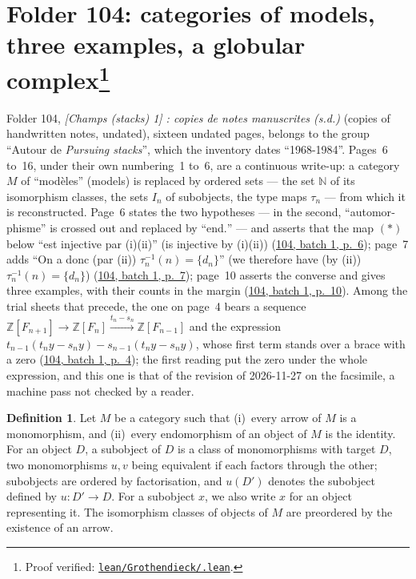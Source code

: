 \documentclass[11pt]{article}
\newcommand{\q}[1]{“#1”}
\newcommand{\fr}[1]{\textfrench{#1}}
\newcommand{\lot}[3]{\href{https://grothendieck.commutator.io/\##1/#2/p#3}{#1, batch #2, p.~#3}}
\newcommand{\verifie}[1]{\footnote{Proof verified: \href{https://github.com/Commutator-IO/grothendieck-project/blob/article-lean-2026-10/lean/Grothendieck/#1.lean}{\texttt{lean/Grothendieck/\detokenize{#1}.lean}}.}}
\theoremstyle{plain}
\theoremstyle{definition}
\newtheorem*{definition}{Definition}
\theoremstyle{remark}
\begin{document}
\section[Folder 104: categories of models, three examples, a globular complex]{Folder 104: categories of models, three examples, a globular complex\protect\verifie{Folder104}}\label{sec:104}

Folder 104, \emph{\fr{[Champs (stacks) 1] : copies de notes manuscrites (s.d.)}} (copies of handwritten notes, undated), sixteen undated pages, belongs to the group \q{Autour de \emph{Pursuing stacks}}, which the inventory dates \q{1968-1984}. Pages~6 to~16, under their own numbering~1 to~6, are a continuous write-up: a category $M$ of \q{\fr{modèles}} (models) is replaced by ordered sets --- the set $\mathbb N$ of its isomorphism classes, the sets $I_n$ of subobjects, the type maps $\tau_n$ --- from which it is reconstructed. Page~6 states the two hypotheses --- in the second, \q{\fr{automorphisme}} is crossed out and replaced by \q{\fr{end.}} --- and asserts that the map $(*)$ below \q{\fr{est injective par (i)(ii)}} (is injective by (i)(ii)) (\lot{104}{1}{6}); page~7 adds \q{\fr{On a donc (par (ii)) $\tau_n^{-1}(n) = \{d_n\}$}} (we therefore have (by (ii)) $\tau_n^{-1}(n) = \{d_n\}$) (\lot{104}{1}{7}); page~10 asserts the converse and gives three examples, with their counts in the margin (\lot{104}{1}{10}). Among the trial sheets that precede, the one on page~4 bears a sequence $\mathbb Z[F_{n+1}] \to \mathbb Z[F_n] \xrightarrow{t_n - s_n} \mathbb Z[F_{n-1}]$ and the expression $t_{n-1}(t_n y - s_n y) - s_{n-1}(t_n y - s_n y)$, whose first term stands over a brace with a zero (\lot{104}{1}{4}); the first reading put the zero under the whole expression, and this one is that of the revision of 2026-11-27 on the facsimile, a machine pass not checked by a reader.

\begin{definition}
Let $M$ be a category such that (i)~every arrow of $M$ is a monomorphism, and (ii)~every endomorphism of an object of $M$ is the identity. For an object $D$, a subobject of $D$ is a class of monomorphisms with target $D$, two monomorphisms $u, v$ being equivalent if each factors through the other; subobjects are ordered by factorisation, and $u(D')$ denotes the subobject defined by $u : D' \to D$. For a subobject $x$, we also write $x$ for an object representing it. The isomorphism classes of objects of $M$ are preordered by the existence of an arrow.
\end{definition}
\end{document}
